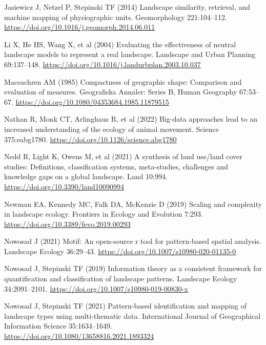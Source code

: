 \documentclass[
  12pt,
  a4paperpaper,
]{article}
\newlength{\cslhangindent}
\newenvironment{CSLReferences}[2] %
 {\begin{list}{}{%
  \setlength{\itemindent}{0pt}
  \setlength{\leftmargin}{0pt}
  \setlength{\parsep}{0pt}
  \ifodd #1
   \setlength{\leftmargin}{\cslhangindent}
   \setlength{\itemindent}{-1\cslhangindent}
  \fi
  \setlength{\itemsep}{#2\baselineskip}}}
 {\end{list}}
\begin{document}
\begin{CSLReferences}{1}{1}
Jasiewicz J, Netzel P, Stepinski TF (2014) Landscape similarity,
retrieval, and machine mapping of physiographic units. Geomorphology
221:104--112. \url{https://doi.org/10.1016/j.geomorph.2014.06.011}

Li X, He HS, Wang X, et al (2004) Evaluating the effectiveness of
neutral landscape models to represent a real landscape. Landscape and
Urban Planning 69:137--148.
\url{https://doi.org/10.1016/j.landurbplan.2003.10.037}

Maceachren AM (1985) Compactness of geographic shape: Comparison and
evaluation of measures. Geografiska Annaler: Series B, Human Geography
67:53--67. \url{https://doi.org/10.1080/04353684.1985.11879515}

Nathan R, Monk CT, Arlinghaus R, et al (2022) Big-data approaches lead
to an increased understanding of the ecology of animal movement. Science
375:eabg1780. \url{https://doi.org/10.1126/science.abg1780}

Nedd R, Light K, Owens M, et al (2021) A synthesis of land use/land
cover studies: Definitions, classification systems, meta-studies,
challenges and knowledge gaps on a global landscape. Land 10:994.
\url{https://doi.org/10.3390/land10090994}

Newman EA, Kennedy MC, Falk DA, McKenzie D (2019) Scaling and complexity
in landscape ecology. Frontiers in Ecology and Evolution 7:293.
\url{https://doi.org/10.3389/fevo.2019.00293}

Nowosad J (2021) Motif: An open-source r tool for pattern-based spatial
analysis. Landscape Ecology 36:29--43.
\url{https://doi.org/10.1007/s10980-020-01135-0}

Nowosad J, Stepinski TF (2019) Information theory as a consistent
framework for quantification and classification of landscape patterns.
Landscape Ecology 34:2091--2101.
\url{https://doi.org/10.1007/s10980-019-00830-x}

Nowosad J, Stepinski TF (2021) Pattern-based identification and mapping
of landscape types using multi-thematic data. International Journal of
Geographical Information Science 35:1634--1649.
\url{https://doi.org/10.1080/13658816.2021.1893324}


\end{CSLReferences}
\end{document}
